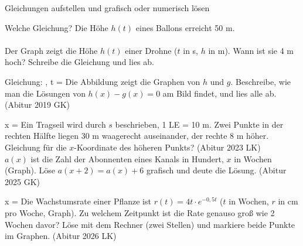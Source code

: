 \setcounter{aufgabe}{16}

\begin{aufgabe}{Gleichungen aufstellen und grafisch oder numerisch lösen}
\begin{teile}
\teil Welche Gleichung? Die Höhe $h(t)$ eines Ballons erreicht 50 m.  \\  \\ 
\teil Der Graph zeigt die Höhe $h(t)$ einer Drohne ($t$ in s, $h$ in m). Wann ist sie 4 m hoch? Schreibe die Gleichung und lies ab.

\begin{ksys}[xmin=0,xmax=6,ymin=0,ymax=6,ablesen]  \end{ksys}
Gleichung: \leerfeld , t = \leerfeld
\teil Die Abbildung zeigt die Graphen von $h$ und $g$. Beschreibe, wie man die Lösungen von $h(x) - g(x) = 0$ am Bild findet, und lies alle ab. \hfill (Abitur 2019 GK) \\

\begin{ksys}[xmin=-4,xmax=4,ymin=-4,ymax=4,ablesen]   \end{ksys}
x = \leerfeld
\teil Ein Tragseil wird durch $s$ beschrieben, 1 LE = 10 m. Zwei Punkte in der rechten Hälfte liegen 30 m waagerecht auseinander, der rechte 8 m höher. Gleichung für die $x$-Koordinate des höheren Punkts? \hfill (Abitur 2023 LK) \\ \leerfeld
\teil $a(x)$ ist die Zahl der Abonnenten eines Kanals in Hundert, $x$ in Wochen (Graph). Löse $a(x + 2) = a(x) + 6$ grafisch und deute die Lösung. \hfill (Abitur 2025 GK) \\

\begin{ksys}[xmin=0,xmax=6,ymin=0,ymax=10,ablesen]  \end{ksys}
x = \leerfeld
\teil Die Wachstumsrate einer Pflanze ist $r(t) = 4t \cdot e^{-0{,}5t}$ ($t$ in Wochen, $r$ in cm pro Woche, Graph). Zu welchem Zeitpunkt ist die Rate genauso groß wie 2 Wochen davor? Löse mit dem Rechner (zwei Stellen) und markiere beide Punkte im Graphen. \hfill (Abitur 2026 LK) \\


\end{teile}
\end{aufgabe}
